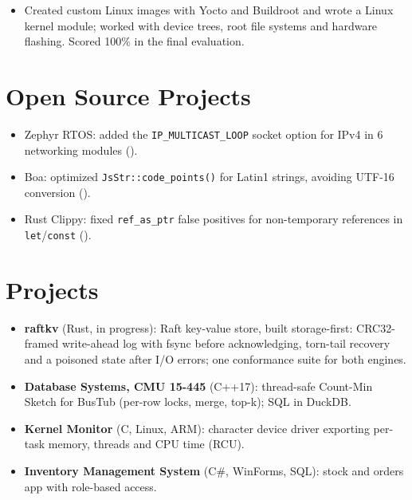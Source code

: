 \documentclass[10pt]{article}
\begin{document}
\begin{itemize}
  \item Created custom Linux images with Yocto and Buildroot and wrote a Linux kernel module; worked with device trees, root file systems and hardware flashing. Scored 100\% in the final evaluation.
\end{itemize}

\section*{Open Source Projects}
\begin{itemize}
  \item Zephyr RTOS: added the \texttt{IP\_MULTICAST\_LOOP} socket option for IPv4 in 6 networking modules ().
  \item Boa: optimized \texttt{JsStr::code\_points()} for Latin1 strings, avoiding UTF-16 conversion ().
  \item Rust Clippy: fixed \texttt{ref\_as\_ptr} false positives for non-temporary references in \texttt{let}/\texttt{const} ().
\end{itemize}

\section*{Projects}
\begin{itemize}
  \item \textbf{raftkv} (Rust, in progress): Raft key-value store, built storage-first: CRC32-framed write-ahead log with fsync before acknowledging, torn-tail recovery and a poisoned state after I/O errors; one conformance suite for both engines. 
  \item \textbf{Database Systems, CMU 15-445} (C++17): thread-safe Count-Min Sketch for BusTub (per-row locks, merge, top-k); SQL in DuckDB. 
  \item \textbf{Kernel Monitor} (C, Linux, ARM): character device driver exporting per-task memory, threads and CPU time (RCU). 
  \item \textbf{Inventory Management System} (C\#, WinForms, SQL): stock and orders app with role-based access. 
\end{itemize}
\end{document}
